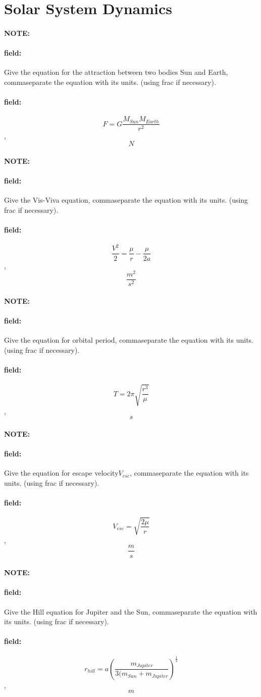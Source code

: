 \documentclass[12pt]{article}
\newenvironment{note}{\paragraph{NOTE:}}{}
\newenvironment{field}{\paragraph{field:}}{}
\begin{document}
\section{Solar System Dynamics}
\begin{note}
   \begin{field}
       Give the equation for the attraction between two bodies Sun and Earth, commaseparate the equation with its units. (using frac if necessary).
   \end{field}
   \begin{field}
		\[
			F=G\frac{M_{Sun}M_{Earth}}{r^2}
		\],
		\[
			N
		\]
   \end{field}
\end{note}
\begin{note}
   \begin{field}
       Give the Vis-Viva equation, commaseparate the equation with its units. (using frac if necessary).
   \end{field}
   \begin{field}
		\[
			\frac{V^2}{2}=\frac{\mu}{r}-\frac{\mu}{2a}
		\],
		\[
			\frac{m^2}{s^2}
		\]
   \end{field}
\end{note}
\begin{note}
   \begin{field}
       Give the equation for orbital period, commaseparate the equation with its units. (using frac if necessary).
   \end{field}
   \begin{field}
		\[
			T=2\pi\sqrt{\frac{r^3}{\mu}}
		\],
		\[
			s
		\]
   \end{field}
\end{note}
\begin{note}
   \begin{field}
       Give the equation for escape velocity\(V_{esc}\), commaseparate the equation with its units. (using frac if necessary).
   \end{field}
   \begin{field}
		\[
			V_{esc}=\sqrt{\frac{2\mu}{r}}
		\],
		\[
			\frac{m}{s}
		\]
   \end{field}
\end{note}
\begin{note}
   \begin{field}
       Give the Hill equation for Jupiter and the Sun, commaseparate the equation with its units. (using frac if necessary).
   \end{field}
   \begin{field}
		\[
			r_{hill}=a{\left(\frac{m_{Jupiter}}{3(m_{Sun}+m_{Jupiter}}\right)}^{\frac{1}{3}}
		\],
		\[
			m
		\]
   \end{field}
\end{note}
\end{document}
